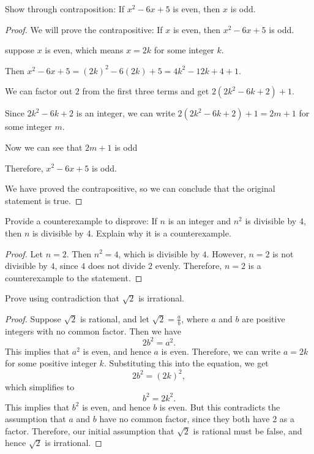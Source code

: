 \documentclass[a4paper]{exam}
\theoremstyle{definition}
\begin{document}
\begin{questions}
  
\question
  Show through contraposition: If $x^2 - 6x + 5$ is even, then $x$ is odd.
  \begin{solution}
    \begin{proof}
      We will prove the contrapositive: If $x$ is even, then $x^2 - 6x + 5$ is odd.
      
      suppose $x$ is even, which means $x = 2k$ for some integer $k$.
      
      Then $x^2 - 6x + 5 = (2k)^2 - 6(2k) + 5 = 4k^2 - 12k + 4 + 1$.
      
      We can factor out $2$ from the first three terms and get $2(2k^2 - 6k + 2) + 1$.
      
      Since $2k^2 - 6k + 2$ is an integer, we can write $2(2k^2 - 6k + 2) + 1 = 2m + 1$ for some integer $m$.
      
      Now we can see that $2m + 1$ is odd
      
      Therefore, $x^2 - 6x + 5$ is odd.
      
      We have proved the contrapositive, so we can conclude that the original statement is true.
      \end{proof}
      
  \end{solution}

\question Provide a counterexample to disprove: If $n$ is an integer and $n^2$ is divisible by 4, then $n$ is divisible by 4. Explain why it is a counterexample.

  \begin{solution}
    \begin{proof}
    Let $n = 2$. Then $n^2 = 4$, which is divisible by $4$. However, $n = 2$ is not divisible by $4$, since $4$ does not divide $2$ evenly. Therefore, $n = 2$ is a counterexample to the statement.
    \end{proof}
  \end{solution}
  
\question Prove using contradiction that $\sqrt{2}$ is irrational.

  \begin{solution}
    \begin{proof}
      Suppose $\sqrt{2}$ is rational, and let $\sqrt{2} = \frac{a}{b}$, where $a$ and $b$ are positive integers with no common factor. Then we have
      \[
      2b^2 = a^2.
      \]
      This implies that $a^2$ is even, and hence $a$ is even. Therefore, we can write $a = 2k$ for some positive integer $k$. Substituting this into the equation, we get
      \[
      2b^2 = (2k)^2,
      \]
      which simplifies to
      \[
      b^2 = 2k^2.
      \]
      This implies that $b^2$ is even, and hence $b$ is even. But this contradicts the assumption that $a$ and $b$ have no common factor, since they both have 2 as a factor. Therefore, our initial assumption that $\sqrt{2}$ is rational must be false, and hence $\sqrt{2}$ is irrational.
      \end{proof}
  \end{solution}
  

\end{questions}
\end{document}
